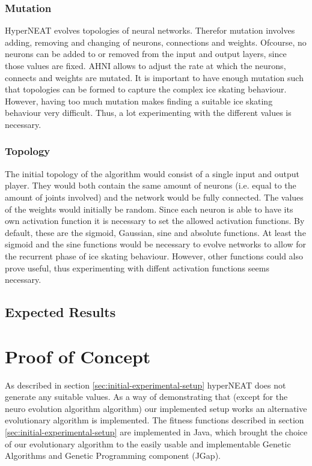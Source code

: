 \documentclass[a4paper,10pt]{article}
\begin{document}
\subsubsection{Mutation}
HyperNEAT evolves topologies of neural networks. Therefor mutation involves adding, removing and changing of neurons, connections and weights. Ofcourse, no neurons can be added to or removed from the input and output layers, since those values are fixed. AHNI allows to adjust the rate at which the neurons, connects and weights are mutated. It is important to have enough mutation such that topologies can be formed to capture the complex ice skating behaviour. However, having too much mutation makes finding a suitable ice skating behaviour very difficult. Thus, a lot experimenting with the different values is necessary. 

\subsubsection{Topology}
The initial topology of the algorithm would consist of a single input and output player. They would both contain the same amount of neurons (i.e. equal to the amount of joints involved) and the network would be fully connected. The values of the weights would initially be random. Since each neuron is able to have its own activation function it is necessary to set the allowed activation functions. By default, these are the sigmoid, Gaussian, sine and absolute functions. At least the sigmoid and the sine functions would be necessary to evolve networks to allow for the recurrent phase of ice skating behaviour. However, other functions could also prove useful, thus experimenting with diffent activation functions seems necessary.

\subsection{Expected Results}



\section{Proof of Concept}
\label{sec:proof-of-concept}
As described in section \ref{sec:initial-experimental-setup} hyperNEAT does not generate any suitable values. As a way of demonstrating that (except for the neuro evolution algorithm algorithm) our implemented setup works an alternative evolutionary algorithm is implemented. The fitness functions described in section \ref{sec:initial-experimental-setup} are implemented in Java, which brought the choice of our evolutionary algorithm to the easily usable and implementable Genetic Algorithms and Genetic Programming component (JGap). 
\end{document}
